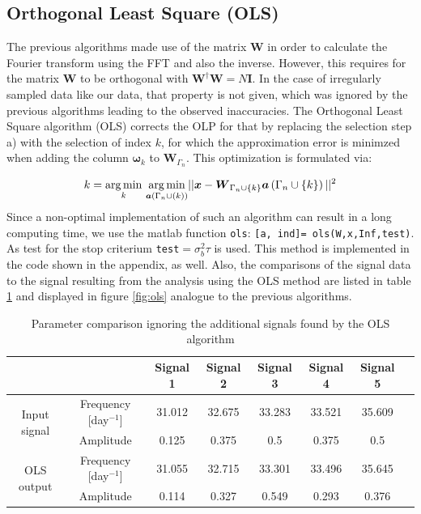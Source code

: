 
\subsection{Orthogonal Least Square (OLS)}
The previous algorithms made use of the matrix $\boldsymbol{W}$ in order to calculate the Fourier transform using the FFT and also the inverse. However, this requires for the matrix $\boldsymbol{W}$ to be orthogonal with $\boldsymbol{W}^{\dag}\boldsymbol{W}=N\boldsymbol{I}$. In the case of irregularly sampled data like our data, that property is not given, which was ignored by the previous algorithms leading to the observed inaccuracies. The Orthogonal Least Square algorithm (OLS) corrects the OLP for that by replacing the selection step a) with the selection of index $k$, for which the approximation error is minimzed when adding the column $\boldsymbol{\omega}_{k}$ to $\boldsymbol{W}_{\Gamma_{n}}$. This optimization is formulated via:

\begin{equation*}
k=\underset{k}{\operatorname*{arg\,min}}\text{ } \underset{\boldsymbol{a}\left(\Gamma_{n}\cup\left(k\right)\right)}{\operatorname*{arg\,min}} ||\boldsymbol{x} - \boldsymbol{W}_{\Gamma_{n}\cup \{k\}}\boldsymbol{a}\left( \Gamma_{n}\cup \{k\}\right)  ||^{2}
\end{equation*}
Since a non-optimal implementation of such an algorithm can result in a long computing time, we use the matlab function \texttt{ols}: \texttt{[a, ind]= ols(W,x,Inf,test)}. As test for the stop criterium \texttt{test}$=\sigma_{b}^{2}\tau$  is used. This method is implemented in the code shown in the appendix, as well. Also, the comparisons of the signal data to the signal resulting from the analysis using the OLS method are listed in table \ref{tab:ols} and displayed in figure \ref{fig:ols} analogue to the previous algorithms. 

\begin{table}[h!]
\centering
\begin{tabular}{ | c| c| c| c| c| c|c|c| }
\hline
	&   & Signal 1 & Signal 2 & Signal 3 & Signal 4 & Signal 5 \\ \hline
\multirow{2}{3cm}{Input signal} & Frequency [day$^{-1}$] & 31.012 & 32.675 & 33.283 & 33.521 & 35.609 \\ \cline{2-7}
 & Amplitude & 0.125 & 0.375 & 0.5 & 0.375 & 0.5 \\ \hline

\multirow{2}{3cm}{OLS output} & Frequency [day$^{-1}$] &31.055  & 32.715 & 33.301 & 33.496  & 35.645  \\ \cline{2-7}
 & Amplitude & 0.114 & 0.327 & 0.549  & 0.293  & 0.376 \\ \hline

\end{tabular}
\caption{Parameter comparison ignoring the additional signals found by the OLS algorithm}
\label{tab:ols}
\end{table}

